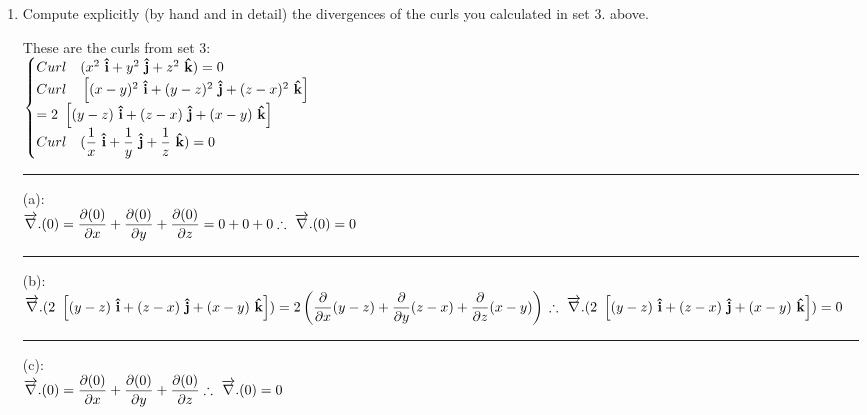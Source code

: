 \documentclass[fleqn]{article}
\begin{document}
\begin{enumerate}
    \item Compute explicitly (by hand and in detail) the divergences of the curls you calculated in set 3. above.

      \textcolor{hwColor}{
        These are the curls from set 3: \\
        $
          \begin{cases}
            Curl ~ (x^2 \mathbf{\hat{i}}+y^2 \mathbf{\hat{j}}+z^2 \mathbf{\hat{k}})=0 \\
            Curl ~ \left[(x-y)^2 \mathbf{\hat{i}}+(y-z)^2 \mathbf{\hat{j}}+(z-x)^2 \mathbf{\hat{k}}\right] \\
            =2 \left[(y-z) \mathbf{\hat{i}}+(z-x) \mathbf{\hat{j}}+(x-y) \mathbf{\hat{k}}\right] \\
            Curl ~ (\dfrac{1}{x} \mathbf{\hat{i}}+\dfrac{1}{y} \mathbf{\hat{j}}+\dfrac{1}{z} \mathbf{\hat{k}})=0 \\
          \end{cases} \\ \\
        $
      }

      \rule{15cm}{1pt}

      \textcolor{hwColor}{
        (a): \\ 
        $
          \overrightarrow{\nabla}.(0)=\dfrac{\partial (0)}{\partial x}+\dfrac{\partial (0)}{\partial y}+\dfrac{\partial (0)}{\partial z} \\
          \\
          =0+0+0 \\
          \\
          \therefore ~ \overrightarrow{\nabla}.(0)=0
        $
      }

      \rule{15cm}{1pt}

      \textcolor{hwColor}{
        (b): \\ 
        $
          \overrightarrow{\nabla}.(2 \left[(y-z) \mathbf{\hat{i}}+(z-x) \mathbf{\hat{j}}+(x-y) \mathbf{\hat{k}}\right]) \\
          =2\left(\dfrac{\partial}{\partial x}(y-z)+\dfrac{\partial}{\partial y}(z-x)+\dfrac{\partial}{\partial z} (x-y) \right) \\
          \\
          \therefore ~ \overrightarrow{\nabla}.(2 \left[(y-z) \mathbf{\hat{i}}+(z-x) \mathbf{\hat{j}}+(x-y) \mathbf{\hat{k}}\right])=0
        $
      }

      \rule{15cm}{1pt}

      \textcolor{hwColor}{
        (c): \\ 
        $
          \overrightarrow{\nabla}.(0)=\dfrac{\partial (0)}{\partial x}+\dfrac{\partial (0)}{\partial y}+\dfrac{\partial (0)}{\partial z} \\
          \\
          \therefore ~ \overrightarrow{\nabla}.(0)=0
        $
      }


\end{enumerate}
\end{document}

